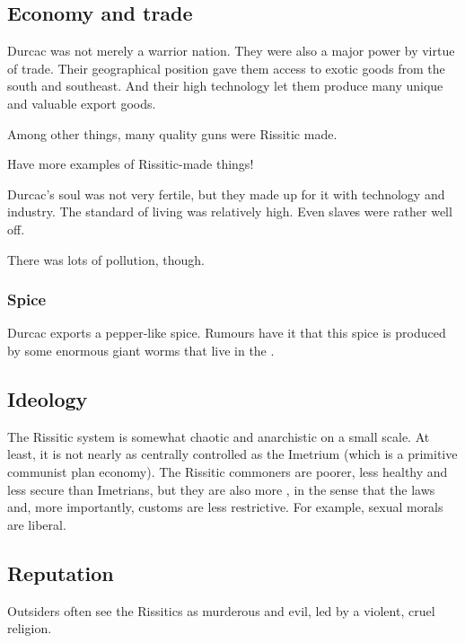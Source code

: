 \subsection{Economy and trade}
Durcac was not merely a warrior nation. 
They were also a major power by virtue of trade. 
Their geographical position gave them access to exotic goods from the south and southeast. 
And their high technology let them produce many unique and valuable export goods. 

Among other things, many quality guns were Rissitic made. 

Have more examples of Rissitic-made things! 

Durcac's soul was not very fertile, but they made up for it with technology and industry. 
The standard of living was relatively high. 
Even slaves were rather well off. 

There was lots of pollution, though. 





\subsubsection{Spice}
Durcac exports a pepper-like spice. 
Rumours have it that this spice is produced by some enormous giant worms that live in the . 









\subsection{Ideology}
The Rissitic system is somewhat chaotic and anarchistic on a small scale. 
At least, it is not nearly as centrally controlled as the Imetrium (which is a primitive communist plan economy). 
The Rissitic commoners are poorer, less healthy and less secure than Imetrians, but they are also more , in the sense that the laws and, more importantly, customs are less restrictive. 
For example, sexual morals are liberal. 





\subsection{Reputation}
Outsiders often see the Rissitics as murderous and evil, led by a violent, cruel religion. 

